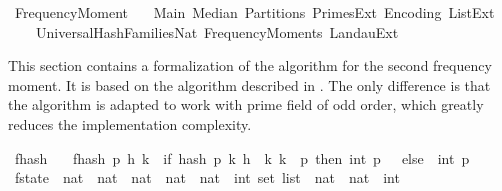 %
\begin{isabellebody}%
%
%
\isadelimdocument
%
\endisadelimdocument
%
\isatagdocument
%
\isamarkuptrue%
%
\endisatagdocument
{\isafolddocument}%
%
\isadelimdocument
%
\endisadelimdocument
%
\isadelimtheory
%
\endisadelimtheory
%
\isatagtheory
{}\isamarkupfalse%
\ Frequency{\isacharunderscore}{\kern0pt}Moment{\isacharunderscore}{\kern0pt}{}\isanewline
\ \ \ Main\ Median\ Partitions\ Primes{\isacharunderscore}{\kern0pt}Ext\ Encoding\ List{\isacharunderscore}{\kern0pt}Ext\ \isanewline
\ \ \ \ Universal{\isacharunderscore}{\kern0pt}Hash{\isacharunderscore}{\kern0pt}Families{\isacharunderscore}{\kern0pt}Nat\ Frequency{\isacharunderscore}{\kern0pt}Moments\ Landau{\isacharunderscore}{\kern0pt}Ext\isanewline
{}%
\endisatagtheory
{\isafoldtheory}%
%
\isadelimtheory
%
\endisadelimtheory
%
\begin{isamarkuptext}%
This section contains a formalization of the algorithm for the second frequency moment.
It is based on the algorithm described in \cite[]{alon1999}.
The only difference is that the algorithm is adapted to work with prime field of odd order, which
greatly reduces the implementation complexity.%
\end{isamarkuptext}\isamarkuptrue%
\isamarkupfalse%
\ f{}{\isacharunderscore}{\kern0pt}hash\ \isanewline
\ \ {\isachardoublequoteopen}f{}{\isacharunderscore}{\kern0pt}hash\ p\ h\ k\ {\isacharequal}{\kern0pt}\ {\isacharparenleft}{\kern0pt}if\ hash\ p\ k\ h\ {\isasymin}\ {\isacharbraceleft}{\kern0pt}k{\isachardot}{\kern0pt}\ {}{\isacharasterisk}{\kern0pt}k\ {\isacharless}{\kern0pt}\ p{\isacharbraceright}{\kern0pt}\ then\ int\ p\ {\isacharminus}{\kern0pt}\ {}\ else\ {\isacharminus}{\kern0pt}\ int\ p\ {\isacharminus}{\kern0pt}\ {}{\isacharparenright}{\kern0pt}{\isachardoublequoteclose}\isanewline
\isanewline
{}\isamarkupfalse%
\ f{}{\isacharunderscore}{\kern0pt}state\ {\isacharequal}{\kern0pt}\ {\isachardoublequoteopen}nat\ {\isasymtimes}\ nat\ {\isasymtimes}\ nat\ {\isasymtimes}\ {\isacharparenleft}{\kern0pt}nat\ {\isasymtimes}\ nat\ {\isasymRightarrow}\ int\ set\ list{\isacharparenright}{\kern0pt}\ {\isasymtimes}\ {\isacharparenleft}{\kern0pt}nat\ {\isasymtimes}\ nat\ {\isasymRightarrow}\ int{\isacharparenright}{\kern0pt}{\isachardoublequoteclose}\isanewline

\end{isabellebody}
